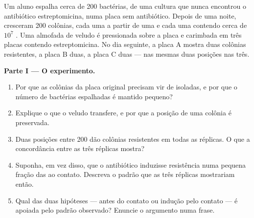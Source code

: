\begin{problem}
\label{pb:g11:mutations:1}
Um aluno espalha cerca de 200 bactérias, de uma cultura que nunca
encontrou o antibiótico estreptomicina, numa placa sem antibiótico.
Depois de uma noite, cresceram 200 colônias, cada uma a partir de uma
 e cada uma contendo cerca de $10^7$ . Uma almofada de
veludo é pressionada sobre a placa e carimbada em três placas contendo
estreptomicina. No dia seguinte, a placa A mostra duas colônias
resistentes, a placa B duas, a placa C duas --- nas mesmas duas
posições nas três.

\medskip
\noindent\textbf{Parte I --- O experimento.}
\begin{enumerate}
  \item Por que as colônias da placa original precisam vir de 
        isoladas, e por que o número de bactérias espalhadas é mantido
        pequeno?
  \item Explique o que o veludo transfere, e por que a posição de uma
        colônia é preservada.
  \item Duas posições entre 200 dão colônias resistentes em todas as
        réplicas. O que a concordância entre as três réplicas mostra?
  \item Suponha, em vez disso, que o antibiótico induzisse resistência
        numa pequena fração das  ao contato. Descreva o padrão
        que as três réplicas mostrariam então.
  \item Qual das duas hipóteses ---  antes do contato ou indução
        pelo contato --- é apoiada pelo padrão observado? Enuncie o
        argumento numa frase.
\end{enumerate}


\end{problem}
